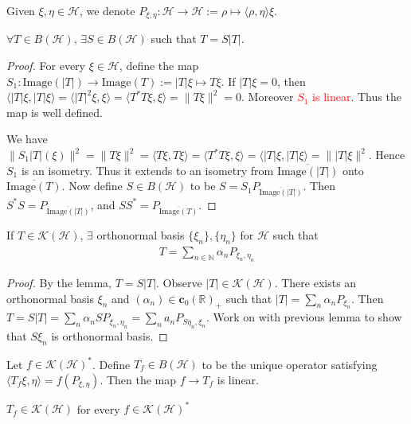 \begin{definition}
  Given $\xi, \eta \in \mathcal{H}$, we denote $P_{\xi, \eta}:
  \mathcal{H} \to  \mathcal{H} := \rho \mapsto  \langle \rho ,  \eta
  \rangle  \xi$.
\end{definition}

\begin{lemma}
  $\forall T \in B(\mathcal{H})$, $\exists S \in B(\mathcal{H})$ such
  that $T = S|T|$.
\end{lemma}
\begin{proof}
  For every $\xi \in \mathcal{H}$, define the map $S_1 :
  \textrm{Image}(|T|) \to  \textrm{Image}(T) := |T|\xi \mapsto  T
  \xi$. If $|T|\xi = 0$, then $ \langle |T|\xi , |T|\xi \rangle =
  \langle |T|^2 \xi,  \xi \rangle = \langle T^*T \xi ,  \xi \rangle =
  \|T \xi\|^2 = 0$. Moreover \textcolor{red}{$S_1$ is linear}. Thus
  the map is well defined.

  We have $\|S_1 |T|(\xi)\|^2 = \|T \xi\|^2 = \langle T \xi ,  T \xi
  \rangle = \langle T^*T \xi ,  \xi \rangle  = \langle |T|\xi , |T|
  \xi \rangle = \||T|\xi\|^2$. Hence $S_1$ is an isometry. Thus it
  extends to an isometry from $\overline{\textrm{Image}(|T|)}$ onto
  $\overline{\textrm{Image}(T)}$. Now define $S \in B(\mathcal{H})$
  to be $S = S_1P_{\overline{ \textrm{Image}(|T|)}}$. Then $  S^*S =
  P_{\overline{ \textrm{Image}(|T|)}}$, and $SS^* = P_{\overline{
  \textrm{Image}(T)}}$.
\end{proof}

\begin{theorem}
  If $T \in \mathcal{K}(\mathcal{H})$, $\exists$ orthonormal basis
  $\{ \xi_n \}, \{ \eta_n \}$ for $\mathcal{H}$ such that
  \begin{align*}
    T = \sum_{n \in \mathbb{N}} \alpha_n P_{\xi_n, \eta_n}
  \end{align*}
\end{theorem}
\begin{proof}
  By the lemma, $T = S|T|$. Observe $|T| \in
  \mathcal{K}(\mathcal{H})$. There exists an orthonormal basis
  $\xi_n$ and $(\alpha_n) \in \textbf{c}_0(\mathbb{R})_+$ such that
  $|T| = \sum_{n} \alpha_n P_{\xi_n}$. Then $T = S |T| = \sum_{n}
  \alpha_n SP_{\xi_n, \eta_n} = \sum_{n} a_n P_{S \eta_n, \xi_n}$.
  Work on with previous lemma to show that $S
  \xi_n$ is orthonormal basis.
\end{proof}

\begin{definition}
  Let $f \in \mathcal{K}(\mathcal{H})^*$. Define $T_f \in
  B(\mathcal{H})$ to be the unique operator satisfying $\langle T_f
  \xi ,  \eta \rangle = f(P_{\xi, \eta})$. Then the map $f \to T_f$ is linear.
\end{definition}

\begin{theorem}
  $T_f \in \mathcal{K}(\mathcal{H})$ for every $   f \in
  \mathcal{K}(\mathcal{H})^*$
\end{theorem}
